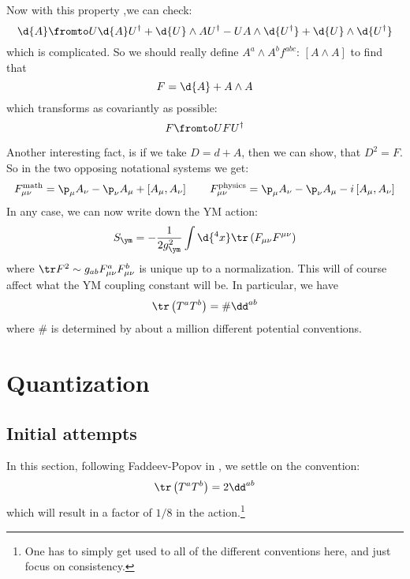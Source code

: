 \documentclass{booc}
\begin{document}
Now with this property ,we can check:
\begin{equation}
\d{A} \fromto
U \d{A}U^\dag + \d{U}\wedge A U^\dag - 
U A \wedge \d{U^\dag} + 
\d{U} \wedge \d{U^\dag}
\end{equation}
which is complicated.
So we should really define
$A^a \wedge A^b f^{abc}$:
$\left[ A\wedge A\right]$
to find that
\begin{equation}
F = \d{A} + A\wedge A
\end{equation}
which transforms as
covariantly as possible:
\begin{equation}
F\fromto U F U^\dag
\end{equation}

Another interesting fact, is if we take
$D = d + A$, then
we can show, that $D^2 = F$.
So in the two opposing notational systems we get:
\begin{equation}
F^{\text{math}}_{\mu\nu} = \p_\mu A_\nu - \p_\nu A_\mu + 
\left[ A_\mu , A_\nu \right]
\qquad
F_{\mu\nu}^{\text{physics}} = 
\p_\mu A_\nu - \p_\nu A_\mu - i\left[ A_\mu , A_\nu\right]
\end{equation}
In any case, we can now write down the YM action:
\begin{equation}
S_{\ym} =- \frac{1}{2g_\ym^2}
\int \d{^4x } \tr\left( F_{\mu\nu}F^{\mu\nu} \right)
\end{equation}
where $\tr F^2 \sim g_{ab}F_{\mu\nu}^a F_{\mu\nu}^b$ 
is unique up to a normalization.
This will of course affect what the YM coupling constant will be.
In particular, we have
\begin{equation}
\tr\left( T^a T^b \right) = \# \dd^{ab}
\end{equation}
where $\#$ is determined by about a million different potential conventions.

\section{Quantization}

\subsection{Initial attempts}

In this section, following Faddeev-Popov in \cite{faddeev_popov_ym},
we settle on the convention:
\begin{equation}
\tr\left( T^a T^b \right) = 
2 \dd^{ab}
\end{equation}
which will result in a factor of $1/8$ in the action.\footnote{
One has to simply get used to all of the different conventions here,
and just focus on consistency.}
\end{document}
